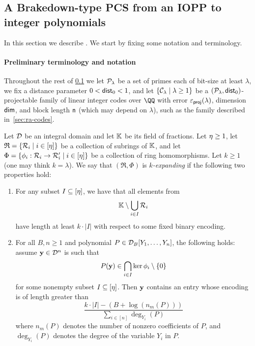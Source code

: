 \documentclass[11pt,letterpaper,usenames,dvipsnames]{article}
\begin{document}
\subsection{A Brakedown-type PCS from an IOPP to integer polynomials}
\label{sec:brakedown-over-q}

In this section we describe \zipp. We start by fixing some notation and terminology.  

\paragraph{Preliminary terminology and notation}
Throughout the rest of \cref{sec:brakedown-over-q}  we let ${\mathcal{P}_{\lambda}}$ be a set of primes each of bit-size at least $\lambda$, we fix a distance parameter $0<\mathsf{dist}_0<1$, and let $\{{\mathcal{C}_{\lambda}}\mid \lambda \geq 1\}$ be a $({\mathcal{P}_{\lambda}},\mathsf{dist}_0)$-projectable family of linear integer codes over $\QQ$ with error $\varepsilon_{{\mathsf{proj}}}(\lambda)$, dimension $\mathsf{dim}$, and block length $\mathsf{n}$  (which may depend on $\lambda$), such as the family described in~\cref{sec:ra-codes}. 

\begin{definition}
\label{def:expanding-family-of-homomorphisms}
 Let $\mathcal{D}$ be an integral domain and let $\mathbb{K}$ be its field of fractions.     Let $\eta\geq 1$, let $\mathfrak{R}=\{\mathcal{R}_i\mid i\in [\eta]\}$ be a collection of subrings of $\mathbb{K}$, and let $\Phi=\{\phi_i: \mathcal{R}_i \to \mathcal{R}_i' \mid i\in [\eta]\}$ be a collection of ring homomorphisms. Let $k\geq 1$ (one may think $k= \lambda$). We say that $(\mathfrak{R}, \Phi)$  is \emph{$k$-expanding} if the following two properties hold:
\begin{enumerate}
  \item  For any subset $I\subseteq [\eta]$, we have that all elements from
  \[
  \mathbb{K} \setminus \bigcup_{i\in I} \mathcal{R}_i
  \]
  have length at least ${k\cdot |I|}$ with respect to some fixed binary encoding. 
  \item For all $B,n\geq 1$ and polynomial $P\in \mathcal{D}_B[Y_1,\ldots, Y_n]$, the following holds: assume $\mathbf{y}\in \mathcal{D}^{n}$ is such that
  \[
  P(\mathbf{y}) \in  \bigcap_{i\in I} \ker \phi_i \setminus \{0\}
  \]
  for some nonempty subset $I\subseteq [\eta]$. Then $\mathbf{y}$ contains an entry whose encoding is of length greater than
  \[
  \frac{k \cdot |I| - (B + \log(n_m(P)))}{\sum_{i\in[n]}\deg_{Y_i}(P)}
  \]
  where $n_m(P)$ denotes the number of nonzero coefficients of $P$, and $\deg_{Y_i}(P)$ denotes the degree of the variable $Y_i$ in $P$.
\end{enumerate}
\end{definition}
\end{document}
